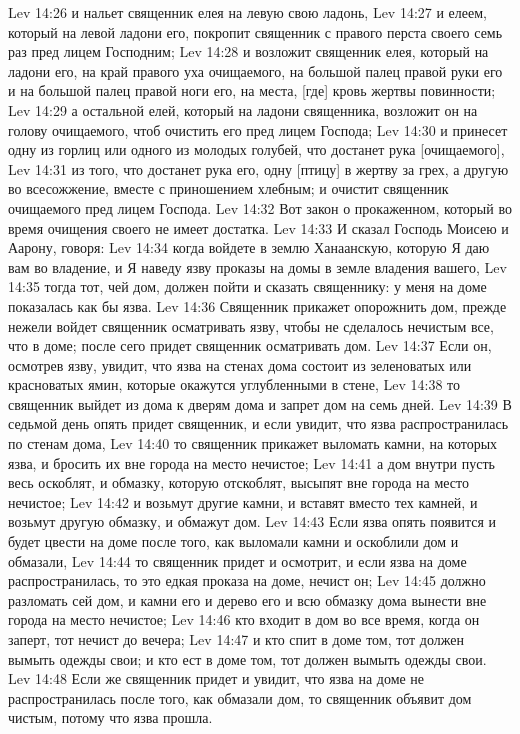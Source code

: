 Lev 14:26  и нальет священник елея на левую свою ладонь,
Lev 14:27  и елеем, который на левой ладони его, покропит священник с правого перста своего семь раз пред лицем Господним;
Lev 14:28  и возложит священник елея, который на ладони его, на край правого уха очищаемого, на большой палец правой руки его и на большой палец правой ноги его, на места, [где] кровь жертвы повинности;
Lev 14:29  а остальной елей, который на ладони священника, возложит он на голову очищаемого, чтоб очистить его пред лицем Господа;
Lev 14:30  и принесет одну из горлиц или одного из молодых голубей, что достанет рука [очищаемого],
Lev 14:31  из того, что достанет рука его, одну [птицу] в жертву за грех, а другую во всесожжение, вместе с приношением хлебным; и очистит священник очищаемого пред лицем Господа.
Lev 14:32  Вот закон о прокаженном, который во время очищения своего не имеет достатка.
Lev 14:33  И сказал Господь Моисею и Аарону, говоря:
Lev 14:34  когда войдете в землю Ханаанскую, которую Я даю вам во владение, и Я наведу язву проказы на домы в земле владения вашего,
Lev 14:35  тогда тот, чей дом, должен пойти и сказать священнику: у меня на доме показалась как бы язва.
Lev 14:36  Священник прикажет опорожнить дом, прежде нежели войдет священник осматривать язву, чтобы не сделалось нечистым все, что в доме; после сего придет священник осматривать дом.
Lev 14:37  Если он, осмотрев язву, увидит, что язва на стенах дома состоит из зеленоватых или красноватых ямин, которые окажутся углубленными в стене,
Lev 14:38  то священник выйдет из дома к дверям дома и запрет дом на семь дней.
Lev 14:39  В седьмой день опять придет священник, и если увидит, что язва распространилась по стенам дома,
Lev 14:40  то священник прикажет выломать камни, на которых язва, и бросить их вне города на место нечистое;
Lev 14:41  а дом внутри пусть весь оскоблят, и обмазку, которую отскоблят, высыпят вне города на место нечистое;
Lev 14:42  и возьмут другие камни, и вставят вместо тех камней, и возьмут другую обмазку, и обмажут дом.
Lev 14:43  Если язва опять появится и будет цвести на доме после того, как выломали камни и оскоблили дом и обмазали,
Lev 14:44  то священник придет и осмотрит, и если язва на доме распространилась, то это едкая проказа на доме, нечист он;
Lev 14:45  должно разломать сей дом, и камни его и дерево его и всю обмазку дома вынести вне города на место нечистое;
Lev 14:46  кто входит в дом во все время, когда он заперт, тот нечист до вечера;
Lev 14:47  и кто спит в доме том, тот должен вымыть одежды свои; и кто ест в доме том, тот должен вымыть одежды свои.
Lev 14:48  Если же священник придет и увидит, что язва на доме не распространилась после того, как обмазали дом, то священник объявит дом чистым, потому что язва прошла.
